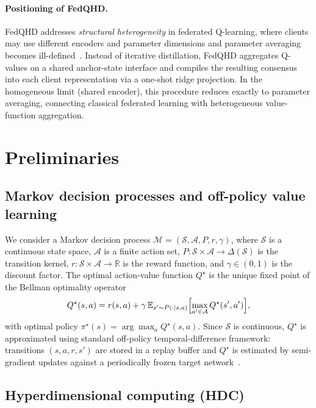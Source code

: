 \documentclass[sigconf,anonymous]{aamas}
\theoremstyle{plain}
\theoremstyle{definition}
\theoremstyle{remark}
\begin{document}
\paragraph{Positioning of FedQHD.}
FedQHD addresses \emph{structural heterogeneity} in federated Q-learning, where clients may use different encoders and parameter dimensions and parameter averaging becomes ill-defined~\citep{fan2023fedhql,jiang2025fedhpd}. Instead of iterative distillation, FedQHD aggregates Q-values on a shared anchor-state interface and compiles the resulting consensus into each client representation via a one-shot ridge projection. In the homogeneous limit (shared encoder), this procedure reduces exactly to parameter averaging, connecting classical federated learning with heterogeneous value-function aggregation.

\section{Preliminaries}
\label{sec:preliminaries}

\subsection{Markov decision processes and off-policy value learning}
We consider a Markov decision process $\mathcal{M} = (\mathcal{S}, \mathcal{A}, P, r, \gamma)$, where $\mathcal{S}$ is a continuous state space, $\mathcal{A}$ is a finite action set, $P:\mathcal{S}\times\mathcal{A}\!\to\!\Delta(\mathcal{S})$ is the transition kernel, $r:\mathcal{S}\times\mathcal{A}\!\to\!\mathbb{R}$ is the reward function, and $\gamma\in(0,1)$ is the discount factor. The optimal action-value function $Q^\star$ is the unique fixed point of the Bellman optimality operator
\[
Q^\star(s,a)= r(s,a) + \gamma\,\mathbb{E}_{s'\sim P(\cdot|s,a)}
\Bigl[\max_{a'\in\mathcal{A}} Q^\star(s',a')\Bigr],
\]
with optimal policy $\pi^\star(s)=\arg\max_a Q^\star(s,a)$. Since $\mathcal{S}$ is continuous, $Q^\star$ is approximated using standard off-policy temporal-difference framework: transitions $(s,a,r,s')$ are stored in a replay buffer and $Q^\star$ is estimated by semi-gradient updates against a periodically frozen target network~\citep{ni2022qhd}.


\subsection{Hyperdimensional computing (HDC)}
\end{document}
